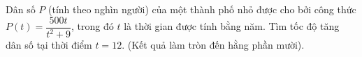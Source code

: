 \begin{ex}%
	Dân số $P$ (tính theo nghìn người) của một thành phố nhỏ được cho bởi công thức $P(t)=\dfrac{500t}{t^2+9}$, trong đó $t$ là thời gian được tính bằng năm. Tìm tốc độ tăng dân số tại thời điểm $t=12$. (Kết quả làm tròn đến hằng phần mười).
	
\end{ex}
